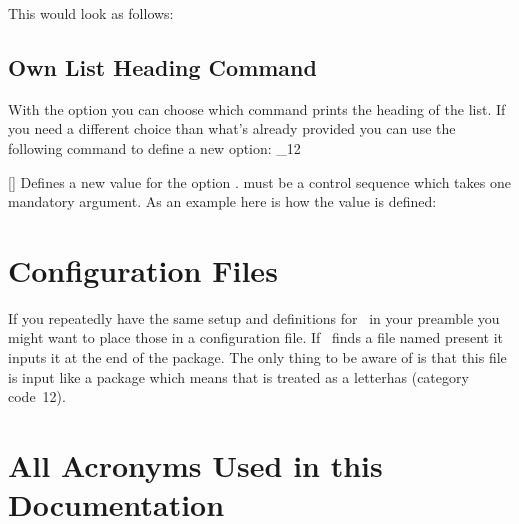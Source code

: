 \documentclass[load-preamble+]{cnltx-doc}
\makeatletter
\renewenvironment{commands}
  {%
    \cnltx@set@catcode_{12}%
    \let\command\cnltx@command
    \cnltxlist
  }
  {\endcnltxlist}
\makeatother
\begin{document}
\begin{sourcecode}
  \newcommand*\addcolon[1]{#1:}
\end{sourcecode}
This would look as follows:
\newcommand*\addcolon[1]{#1:}
\printacronyms

\subsection{Own List Heading Command}

With the option  you can choose which command prints the
heading of the list.  If you need a different choice than what's already
provided you can use the following command to define a new option:
\begin{commands}
  \command{DeclareAcroListHeading}[]
    Defines a new value  for the option .
     must be a control sequence which takes one
    mandatory argument.
\end{commands}
As an example here is how the value  is defined:
\begin{sourcecode}
\end{sourcecode}

\section{Configuration Files}
If you repeatedly have the same setup and definitions for
\acro\ in your preamble you might want to place those in a configuration file.
If \acro\ finds a file named  present it inputs it at the end
of the package.  The only thing to be aware of is that this file is input like
a package which means that  is treated as a letterhas (category
code~12).

\appendix

\section{All Acronyms Used in this Documentation}\label{sec:documentation_acronyms}
\printacronyms[name=All Acronyms,heading=none]
\end{document}
